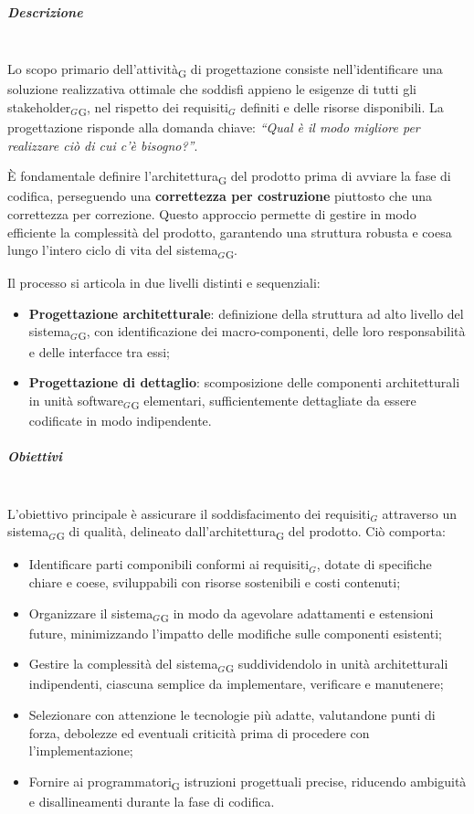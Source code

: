 \documentclass[a4paper, 10pt]{article}
\begin{document}
\subparagraph{Descrizione}~\\

Lo scopo primario dell'attività\textsubscript{G} di progettazione consiste nell'identificare una soluzione realizzativa ottimale che soddisfi appieno le esigenze di tutti gli stakeholder$_G$\textsubscript{G}, nel rispetto dei requisiti$_G$ definiti e delle risorse disponibili. La progettazione risponde alla domanda chiave: \textit{``Qual è il modo migliore per realizzare ciò di cui c'è bisogno?''}.

È fondamentale definire l'architettura\textsubscript{G} del prodotto prima di avviare la fase di codifica, perseguendo una \textbf{correttezza per costruzione} piuttosto che una correttezza per correzione. Questo approccio permette di gestire in modo efficiente la complessità del prodotto, garantendo una struttura robusta e coesa lungo l'intero ciclo di vita del sistema$_G$\textsubscript{G}.

Il processo si articola in due livelli distinti e sequenziali:
\begin{itemize}
    \item \textbf{Progettazione architetturale}: definizione della struttura ad alto livello del sistema$_G$\textsubscript{G}, con identificazione dei macro-componenti, delle loro responsabilità e delle interfacce tra essi;
    \item \textbf{Progettazione di dettaglio}: scomposizione delle componenti architetturali in unità software$_G$\textsubscript{G} elementari, sufficientemente dettagliate da essere codificate in modo indipendente.
\end{itemize}

\subparagraph{Obiettivi}~\\

L'obiettivo principale è assicurare il soddisfacimento dei requisiti$_G$ attraverso un sistema$_G$\textsubscript{G} di qualità, delineato dall'architettura\textsubscript{G} del prodotto. Ciò comporta:

\begin{itemize}
    \item Identificare parti componibili conformi ai requisiti$_G$, dotate di specifiche chiare e coese, sviluppabili con risorse sostenibili e costi contenuti;
    \item Organizzare il sistema$_G$\textsubscript{G} in modo da agevolare adattamenti e estensioni future, minimizzando l'impatto delle modifiche sulle componenti esistenti;
    \item Gestire la complessità del sistema$_G$\textsubscript{G} suddividendolo in unità architetturali indipendenti, ciascuna semplice da implementare, verificare e manutenere;
    \item Selezionare con attenzione le tecnologie più adatte, valutandone punti di forza, debolezze ed eventuali criticità prima di procedere con l'implementazione;
    \item Fornire ai programmatori\textsubscript{G} istruzioni progettuali precise, riducendo ambiguità e disallineamenti durante la fase di codifica.
\end{itemize}
\end{document}
